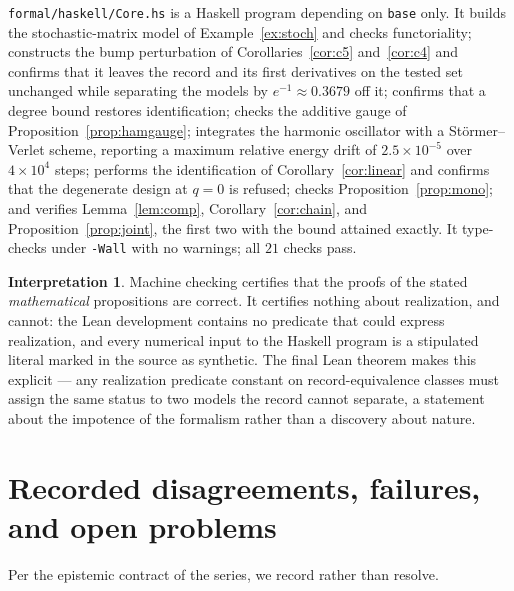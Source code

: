 \documentclass[11pt]{article}
\theoremstyle{definition}
\newtheorem{interpretation}[definition]{Interpretation}
\begin{document}
\texttt{formal/haskell/Core.hs} is a Haskell program depending on \texttt{base}
only. It builds the stochastic-matrix model of Example~\ref{ex:stoch} and checks
functoriality; constructs the bump perturbation of Corollaries~\ref{cor:c5}
and~\ref{cor:c4} and confirms that it leaves the record and its first
derivatives on the tested set unchanged while separating the models by
$e^{-1}\approx0.3679$ off it; confirms that a degree bound restores
identification; checks the additive gauge of Proposition~\ref{prop:hamgauge};
integrates the harmonic oscillator with a St\"ormer--Verlet scheme, reporting a
maximum relative energy drift of $2.5\times10^{-5}$ over $4\times10^4$ steps;
performs the identification of Corollary~\ref{cor:linear} and confirms that the
degenerate design at $q=0$ is refused; checks Proposition~\ref{prop:mono}; and
verifies Lemma~\ref{lem:comp}, Corollary~\ref{cor:chain}, and
Proposition~\ref{prop:joint}, the first two with the bound attained exactly. It
type-checks under \texttt{-Wall} with no warnings; all $21$ checks pass.

\begin{interpretation}
\label{int:formal}
Machine checking certifies that the proofs of the stated \emph{mathematical}
propositions are correct. It certifies nothing about realization, and cannot:
the Lean development contains no predicate that could express realization, and
every numerical input to the Haskell program is a stipulated literal marked in
the source as synthetic. The final Lean theorem makes this explicit --- any
realization predicate constant on record-equivalence classes must assign the
same status to two models the record cannot separate, a statement about the
impotence of the formalism rather than a discovery about nature.
\end{interpretation}

\section{Recorded disagreements, failures, and open problems}
\label{sec:open}

Per the epistemic contract of the series, we record rather than resolve.
\end{document}
